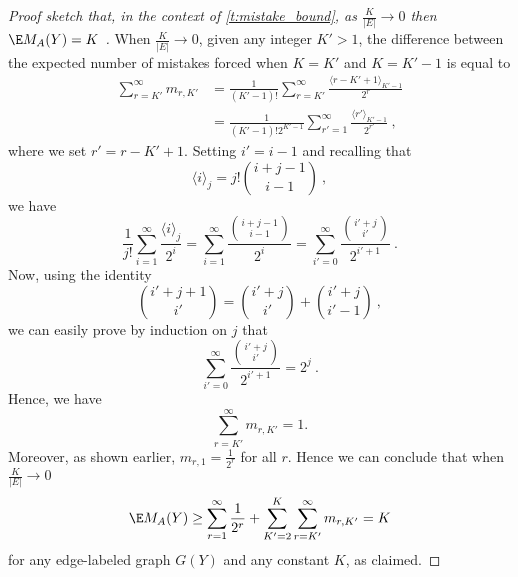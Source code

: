 \begin{proof}[Proof sketch that, in the context of \autoref{t:mistake_bound}, as $\frac{K}{|E|}
  \rightarrow 0$ then $\E M_A(Y)=K$  ]
\bigskip

When $\frac{K}{|E|} \rightarrow 0$, given any integer $K'>1$, the difference between the expected
number of mistakes forced when $K=K'$ and $K=K'-1$ is equal to
%
\begin{align*}
  \sum_{r=K'}^{\infty} m_{r,K'}
  &=
  \frac{1}{(K'-1)!}\sum_{r=K'}^{\infty} \frac{\langle r-K'+1\rangle_{K'-1}}{2^{r}}\\
  &=
  \frac{1}{(K'-1)!2^{K'-1}}\sum_{r'=1}^{\infty} \frac{\langle r'\rangle_{K'-1}}{2^{r'}}~,
\end{align*}
% 
where we set $r'=r-K'+1$.
Setting $i'=i-1$ and recalling that
\[
\langle i\rangle_j=j!{{i+j-1}\choose{i-1}}~,
\]
we have
\[
\frac{1}{j!}\sum_{i=1}^{\infty}\frac{\langle i\rangle_j}{2^i}=
\sum_{i=1}^{\infty}\frac{{{i+j-1}\choose{i-1}}}{2^i}=
\sum_{i'=0}^{\infty}\frac{{{i'+j}\choose{i'}}}{2^{i'+1}}~.
\]
Now, using the identity
\[
{i'+j+1 \choose i'} = {i'+j \choose i'} + {i'+j \choose i'-1}~,
\]
we can easily prove by induction on $j$ that
\[
\sum_{i'=0}^{\infty}\frac{{{i'+j}\choose{i'}}}{2^{i'+1}}=2^j~.
\]
Hence, we have
\[
\sum_{r=K'}^{\infty} m_{r,K'}=1.
\]
Moreover, as shown earlier, $m_{r,1}=\frac{1}{2^{r}}$ for all $r$. Hence we can conclude that when $\frac{K}{|E|} \rightarrow 0$ 
\[
\E M_A(Y) \ge
\sum_{r=1}^{\infty} \frac{1}{2^{r}} +
\sum_{K'=2}^{K} \sum_{r=K'}^{\infty} m_{r,K'}=K
\]
for any edge-labeled graph $G(Y)$ and any constant $K$, as claimed.
\end{proof}


\iffalse %
In the special case when the bias is
\[
    \Psi(Y) = \min\big\{\Psiin(Y),\Psiout(Y)\big\}
\]
where
\[
    \Psiin(Y) = \sum_{j \in V} \min\big\{\din^-(v),\din^+(v)\big\}
\]
and
\[
    \Psiout(Y) = \sum_{i \in V} \min\big\{\dout^-(u),\dout^+(u)\big\}
\]
then using Randomized Weighted Majority on the two experts
\[
    \Yhat^{(1)}_{u,v} = \sgn\left(\frac{1}{2}-\frac{\hdout^-(u)}{\hdout(u)}\right)
\qquad\text{and}\qquad
    \Yhat^{(2)}_{u,v} = \sgn\left(\frac{1}{2}-\frac{\hdin^-(v)}{\hdin(v)}\right)
\]
we get an expected mistake bound of
\[
    2\Psi(Y) + \sqrt{(4\log 2) \Psi(Y)}~.
\]
\fi %

